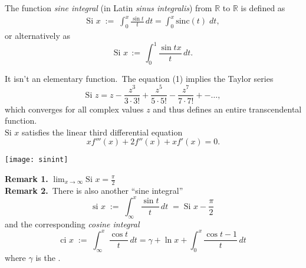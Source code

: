 \documentclass[12pt]{article}
\begin{document}
The function {\em sine integral} (in Latin {\em sinus integralis}) from $\mathbb{R}$ to $\mathbb{R}$ is defined as
\begin{align}   
\mbox{Si }{x} \;:=\; \int_0^x\frac{\sin t}{t}\,dt = 
\int_0^x\mbox{sinc}(t)\;dt,
\end{align}
or alternatively as
$$\mbox{Si }{x} \,:=\,  \int_0^1\frac{\sin{tx}}{t}\,dt.$$

It isn't an elementary function.\, The equation (1) implies the Taylor series 
   $$\mbox{Si }{z} = z\!-\!\frac{z^3}{3\!\cdot\!3!}\!+\!\frac{z^5}{5\!\cdot\!5!}
                \!-\!\frac{z^7}{7\!\cdot\!7!}\!+-\ldots,$$
which converges for all complex values $z$ and thus defines an entire transcendental function.\\

$\mbox{Si }{x}$ satisfies the linear third  differential equation
          $$xf'''(x)\!+\!2f''(x)\!+\!xf'(x) =  0.$$

\begin{center}
\texttt{[image: sinint]}
\end{center}

\textbf{Remark 1.} \quad$\lim_{x\to\infty}\mbox{Si }{x} = \frac{\pi}{2}$\\

\textbf{Remark 2.}\, There is also another ``sine integral''
$$\mbox{si }{x}\; :=\; \int_\infty^x\frac{\sin t}{t}\,dt\; =\; \mbox{Si }{x}-\frac{\pi}{2}$$
and the corresponding {\em cosine integral}
$$\mbox{ci }{x} \;:=\; \int_\infty^x\frac{\cos t}{t}\,dt = \gamma\!+\ln{x}+\!\int_0^x\frac{\cos{t}\!-\!1}{t}\,dt$$
where $\gamma$ is the .

\end{document}
